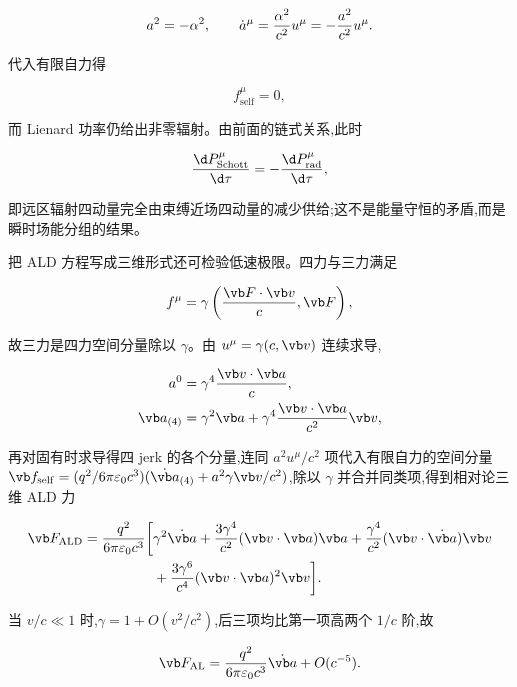 \begin{equation*}
 a^2=-\alpha^2,
 \qquad
 \dot a^\mu={\alpha^2\over c^2}u^\mu
 =-{a^2\over c^2}u^\mu.
\end{equation*}

代入有限自力得

\begin{equation*}
 f_{\mathrm{self}}^\mu=0,
\end{equation*}

而 Lienard 功率仍给出非零辐射。由前面的链式关系,此时

\begin{equation*}
 {\d P_{\mathrm{Schott}}^\mu\over\d\tau}
 =-{\d P_{\mathrm{rad}}^\mu\over\d\tau},
\end{equation*}

即远区辐射四动量完全由束缚近场四动量的减少供给;这不是能量守恒的矛盾,而是瞬时场能分组的结果。

把 ALD 方程写成三维形式还可检验低速极限。四力与三力满足

\begin{equation*}
 f^\mu=\gamma\left({\vb F\cdot\vb v\over c},\vb F\right),
\end{equation*}

故三力是四力空间分量除以 $\gamma$。由 $u^\mu=\gamma(c,\vb v)$ 连续求导,

\begin{align*}
 a^0&=\gamma^4{\vb v\cdot\vb a\over c},\\
 \vb a_{(4)}&=\gamma^2\vb a
 +\gamma^4{\vb v\cdot\vb a\over c^2}\vb v,
\end{align*}

再对固有时求导得四 jerk 的各个分量,连同 $a^2u^\mu/c^2$ 项代入有限自力的空间分量 $\vb f_{\mathrm{self}}=(q^2/6\pi\varepsilon_0c^3)(\dot{\vb a}_{(4)}+a^2\gamma\vb v/c^2)$,除以 $\gamma$ 并合并同类项,得到相对论三维 ALD 力

\begin{align*}
 \vb F_{\mathrm{ALD}}
 ={q^2\over6\pi\varepsilon_0c^3}
 \bigg[{}
 &\gamma^2\dot{\vb a}
 +{3\gamma^4\over c^2}(\vb v\cdot\vb a)\vb a
 +{\gamma^4\over c^2}(\vb v\cdot\dot{\vb a})\vb v\\
 &+{3\gamma^6\over c^4}(\vb v\cdot\vb a)^2\vb v
 \bigg].
\end{align*}

当 $v/c\ll1$ 时,$\gamma=1+O(v^2/c^2)$,后三项均比第一项高两个 $1/c$ 阶,故

\begin{equation*}
 \vb F_{\mathrm{AL}}
 ={q^2\over6\pi\varepsilon_0c^3}\dot{\vb a}
 +O(c^{-5}).
\end{equation*}

